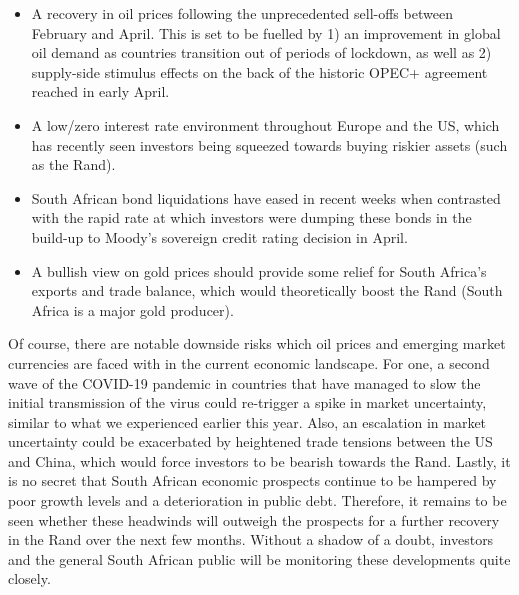 \documentclass[
]{article}
\providecommand{\tightlist}{%
  \setlength{\itemsep}{0pt}\setlength{\parskip}{0pt}}
\begin{document}
\begin{itemize}
\tightlist
\item
  A recovery in oil prices following the unprecedented sell-offs between
  February and April. This is set to be fuelled by 1) an improvement in
  global oil demand as countries transition out of periods of lockdown,
  as well as 2) supply-side stimulus effects on the back of the historic
  OPEC+ agreement reached in early April.
\item
  A low/zero interest rate environment throughout Europe and the US,
  which has recently seen investors being squeezed towards buying
  riskier assets (such as the Rand).
\item
  South African bond liquidations have eased in recent weeks when
  contrasted with the rapid rate at which investors were dumping these
  bonds in the build-up to Moody's sovereign credit rating decision in
  April.
\item
  A bullish view on gold prices should provide some relief for South
  Africa's exports and trade balance, which would theoretically boost
  the Rand (South Africa is a major gold producer).
\end{itemize}

Of course, there are notable downside risks which oil prices and
emerging market currencies are faced with in the current economic
landscape. For one, a second wave of the COVID-19 pandemic in countries
that have managed to slow the initial transmission of the virus could
re-trigger a spike in market uncertainty, similar to what we experienced
earlier this year. Also, an escalation in market uncertainty could be
exacerbated by heightened trade tensions between the US and China, which
would force investors to be bearish towards the Rand. Lastly, it is no
secret that South African economic prospects continue to be hampered by
poor growth levels and a deterioration in public debt. Therefore, it
remains to be seen whether these headwinds will outweigh the prospects
for a further recovery in the Rand over the next few months. Without a
shadow of a doubt, investors and the general South African public will
be monitoring these developments quite closely.
\end{document}
